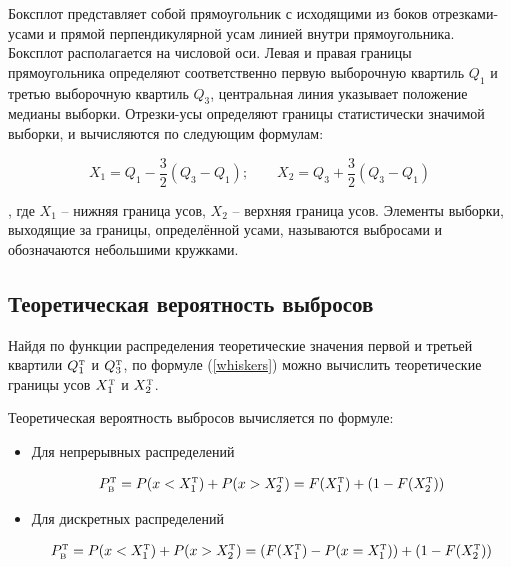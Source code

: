 \documentclass[12pt]{article}
\begin{document}
\begin{flushleft}
        Боксплот представляет собой прямоугольник с исходящими из боков отрезками-усами и прямой перпендикулярной усам линией внутри прямоугольника. Боксплот располагается на числовой оси. Левая и правая границы прямоугольника определяют соответственно первую выборочную квартиль $Q_1$ и третью выборочную квартиль $Q_3$, центральная линия указывает положение медианы выборки. Отрезки-усы определяют границы статистически значимой выборки, и вычисляются по следующим формулам:

        \begin{equation}
            X_1 = Q_1 - \frac{3}{2} (Q_3 - Q_1); \qquad X_2 = Q_3 + \frac{3}{2} (Q_3 - Q_1)
            \label{whiskers}
        \end{equation}

        \noindent, где $X_1$ -- нижняя граница усов, $X_2$ -- верхняя граница усов. Элементы выборки, выходящие за границы, определённой усами, называются выбросами и обозначаются небольшими кружками.

    \subsection{Теоретическая вероятность выбросов}

        Найдя по функции распределения теоретические значения первой и третьей квартили $Q_1^{\text{\tiny{T}}}$ и $Q_3^{\text{\tiny{T}}}$, по формуле (\ref{whiskers}) можно вычислить теоретические границы усов $X_1^{\text{\tiny{T}}}$ и $X_2^{\text{\tiny{T}}}$.

        Теоретическая вероятность выбросов вычисляется по формуле:\cite{boxplot}

        \begin{itemize}
            \item Для непрерывных распределений

            \begin{equation}
                P_{\text{\tiny{B}}}^{\text{\tiny{T}}} = P(x < X_1^{\text{\tiny{T}}}) + P(x > X_2^{\text{\tiny{T}}}) = F(X_1^{\text{\tiny{T}}}) + (1 - F(X_2^{\text{\tiny{T}}}))
                \label{PС}
            \end{equation}

            \item Для дискретных распределений
            
            \begin{equation}
                P_{\text{\tiny{B}}}^{\text{\tiny{T}}} = P(x < X_1^{\text{\tiny{T}}}) + P(x > X_2^{\text{\tiny{T}}}) = (F(X_1^{\text{\tiny{T}}}) - P(x = X_1^{\text{\tiny{T}}})) + (1 - F(X_2^{\text{\tiny{T}}}))
                \label{PD}
            \end{equation}
            

\end{itemize}
\end{flushleft}
\end{document}
